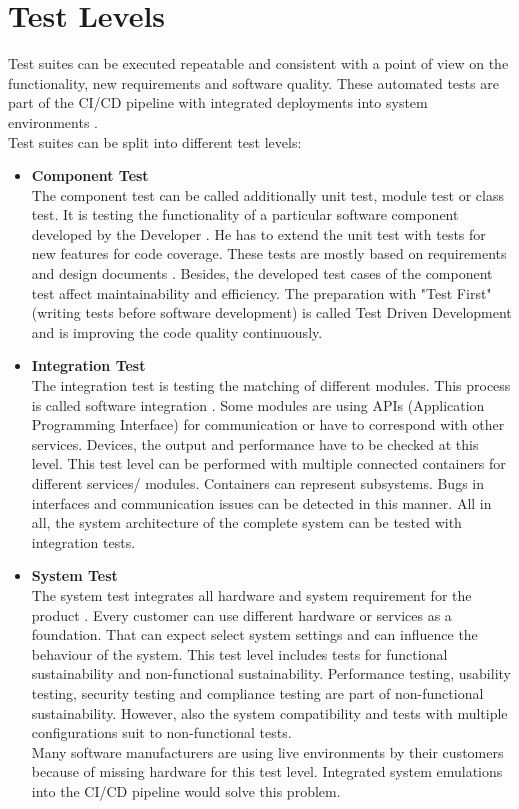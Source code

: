 \section{Test Levels}\label{TestLevel}

Test suites can be executed repeatable and consistent with a point of view on the functionality, new requirements and software quality. These automated tests are part of the \gls{CI/CD} pipeline with integrated deployments into system environments \cite[~p.112]{Scholl2019}. \\
Test suites can be split into different test levels:
\begin{itemize}
\item \textbf{Component Test}  \\
The component test can be called additionally unit test, module test or class test. 
It is testing the functionality of a particular software component developed by the Developer \cite[~p.66]{Spillner2019}.
He has to extend the unit test with tests for new features for code coverage. These tests are mostly based on requirements and design documents \cite[~p.63]{Spillner2019}. Besides, the developed test cases of the component test affect maintainability and efficiency.
The preparation with "Test First" (writing tests before software development) is called Test Driven Development and is improving the code quality continuously.

\item \textbf{Integration Test} \\
The integration test is testing the matching of different modules. This process is called software integration \cite[~p.71]{Spillner2019}. Some modules are using APIs (Application Programming Interface) for communication or have to correspond with other services.
Devices, the output and performance have to be checked at this level.
This test level can be performed with multiple connected containers for different services/ modules. Containers can represent subsystems. Bugs in interfaces and communication issues can be detected in this manner.
All in all, the system architecture of the complete system can be tested with integration tests.

\item \textbf{System Test} \\
The system test integrates all hardware and system requirement for the product \cite[~p.79]{Spillner2019}.
Every customer can use different hardware or services as a foundation. That can expect select system settings and can influence the behaviour of the system.
This test level includes tests for functional sustainability \cite[~p.87]{Spillner2019} and non-functional sustainability.
Performance testing, usability testing, security testing and compliance testing are part of non-functional sustainability. However, also the system compatibility and tests with multiple configurations suit to non-functional tests. \\
Many software manufacturers are using live environments by their customers because of missing hardware for this test level. Integrated system emulations into the \gls{CI/CD} pipeline would solve this problem.


\end{itemize}
